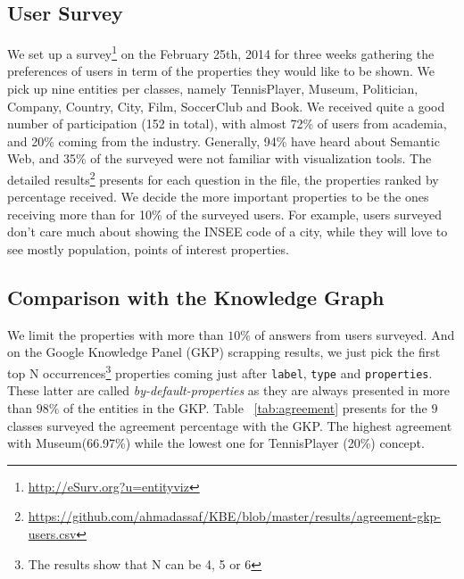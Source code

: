 \documentclass[runningheads,a4paper]{llncs}
\begin{document}
\subsection{User Survey}
\label{sec:survey}
We set up a survey\footnote{\url{http://eSurv.org?u=entityviz}} on the February 25th, 2014 for three weeks gathering the preferences of users in term of the properties they would like to be shown. We pick up nine entities per classes, namely \textsf{TennisPlayer}, \textsf{Museum}, \textsf{Politician}, \textsf{Company}, \textsf{Country}, \textsf{City}, \textsf{Film}, \textsf{SoccerClub} and \textsf{Book}.
We received quite a good number of participation (152 in total), with almost 72\% of users from academia, and 20\% coming from the industry. Generally, 94\% have heard about Semantic Web, and 35\% of the surveyed were not familiar with visualization tools. The detailed results\footnote{\url{https://github.com/ahmadassaf/KBE/blob/master/results/agreement-gkp-users.csv}} presents for each question in the file, the properties ranked by percentage received. We decide the more important properties to be the ones receiving more than for 10\% of the surveyed users.
 For example, users surveyed don't care much about showing the \textsf{INSEE code} of a city, while they will love to see mostly \textsf{population}, \textsf{points of interest} properties.

\subsection{Comparison with the Knowledge Graph}
\label{sec:comparison}
We limit the properties with more than $10\%$ of answers from users surveyed. And on the Google Knowledge Panel (GKP) scrapping  results, we just pick the first top N occurrences\footnote{The results show that N can be 4, 5 or 6} properties coming just after \texttt{label}, \texttt{type} and \texttt{properties}. These latter are called \textit{by-default-properties} as they are always presented in more than $98\%$ of the entities in the GKP. Table ~\ref{tab:agreement} presents for the $9$ classes surveyed the agreement percentage with the GKP. The highest agreement with \textsf{Museum}(66.97\%) while the lowest one for \textsf{TennisPlayer} (20\%) concept.
\end{document}
